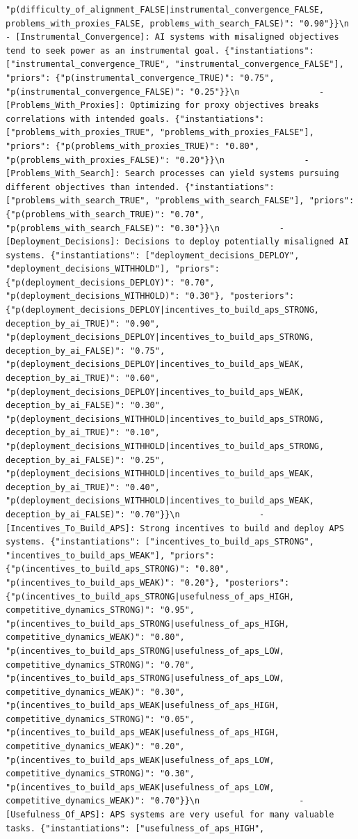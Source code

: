 \documentclass[
  11pt,
  letterpaper,
]{book}
\begin{document}
\begin{verbatim}
"p(difficulty_of_alignment_FALSE|instrumental_convergence_FALSE, problems_with_proxies_FALSE, problems_with_search_FALSE)": "0.90"}}\n                - [Instrumental_Convergence]: AI systems with misaligned objectives tend to seek power as an instrumental goal. {"instantiations": ["instrumental_convergence_TRUE", "instrumental_convergence_FALSE"], "priors": {"p(instrumental_convergence_TRUE)": "0.75", "p(instrumental_convergence_FALSE)": "0.25"}}\n                - [Problems_With_Proxies]: Optimizing for proxy objectives breaks correlations with intended goals. {"instantiations": ["problems_with_proxies_TRUE", "problems_with_proxies_FALSE"], "priors": {"p(problems_with_proxies_TRUE)": "0.80", "p(problems_with_proxies_FALSE)": "0.20"}}\n                - [Problems_With_Search]: Search processes can yield systems pursuing different objectives than intended. {"instantiations": ["problems_with_search_TRUE", "problems_with_search_FALSE"], "priors": {"p(problems_with_search_TRUE)": "0.70", "p(problems_with_search_FALSE)": "0.30"}}\n            - [Deployment_Decisions]: Decisions to deploy potentially misaligned AI systems. {"instantiations": ["deployment_decisions_DEPLOY", "deployment_decisions_WITHHOLD"], "priors": {"p(deployment_decisions_DEPLOY)": "0.70", "p(deployment_decisions_WITHHOLD)": "0.30"}, "posteriors": {"p(deployment_decisions_DEPLOY|incentives_to_build_aps_STRONG, deception_by_ai_TRUE)": "0.90", "p(deployment_decisions_DEPLOY|incentives_to_build_aps_STRONG, deception_by_ai_FALSE)": "0.75", "p(deployment_decisions_DEPLOY|incentives_to_build_aps_WEAK, deception_by_ai_TRUE)": "0.60", "p(deployment_decisions_DEPLOY|incentives_to_build_aps_WEAK, deception_by_ai_FALSE)": "0.30", "p(deployment_decisions_WITHHOLD|incentives_to_build_aps_STRONG, deception_by_ai_TRUE)": "0.10", "p(deployment_decisions_WITHHOLD|incentives_to_build_aps_STRONG, deception_by_ai_FALSE)": "0.25", "p(deployment_decisions_WITHHOLD|incentives_to_build_aps_WEAK, deception_by_ai_TRUE)": "0.40", "p(deployment_decisions_WITHHOLD|incentives_to_build_aps_WEAK, deception_by_ai_FALSE)": "0.70"}}\n                - [Incentives_To_Build_APS]: Strong incentives to build and deploy APS systems. {"instantiations": ["incentives_to_build_aps_STRONG", "incentives_to_build_aps_WEAK"], "priors": {"p(incentives_to_build_aps_STRONG)": "0.80", "p(incentives_to_build_aps_WEAK)": "0.20"}, "posteriors": {"p(incentives_to_build_aps_STRONG|usefulness_of_aps_HIGH, competitive_dynamics_STRONG)": "0.95", "p(incentives_to_build_aps_STRONG|usefulness_of_aps_HIGH, competitive_dynamics_WEAK)": "0.80", "p(incentives_to_build_aps_STRONG|usefulness_of_aps_LOW, competitive_dynamics_STRONG)": "0.70", "p(incentives_to_build_aps_STRONG|usefulness_of_aps_LOW, competitive_dynamics_WEAK)": "0.30", "p(incentives_to_build_aps_WEAK|usefulness_of_aps_HIGH, competitive_dynamics_STRONG)": "0.05", "p(incentives_to_build_aps_WEAK|usefulness_of_aps_HIGH, competitive_dynamics_WEAK)": "0.20", "p(incentives_to_build_aps_WEAK|usefulness_of_aps_LOW, competitive_dynamics_STRONG)": "0.30", "p(incentives_to_build_aps_WEAK|usefulness_of_aps_LOW, competitive_dynamics_WEAK)": "0.70"}}\n                    - [Usefulness_Of_APS]: APS systems are very useful for many valuable tasks. {"instantiations": ["usefulness_of_aps_HIGH", 
\end{verbatim}
\end{document}
